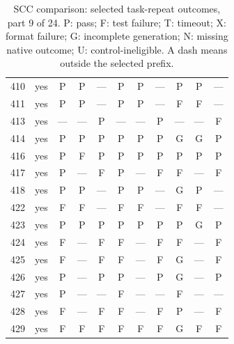 \begin{table}[p]
\begin{tabular*}{\textwidth}{@{\extracolsep{\fill}}rc*{9}{c}@{}}
410 & yes & P & P & — & P & P & — & P & P & —\\
411 & yes & P & P & — & P & P & — & F & F & —\\
413 & yes & — & — & P & — & — & P & — & — & F\\
414 & yes & P & P & P & P & P & P & G & G & P\\
416 & yes & P & F & P & P & P & P & P & P & P\\
417 & yes & P & — & F & P & — & F & F & — & F\\
418 & yes & P & P & — & P & P & — & G & P & —\\
422 & yes & F & F & — & F & F & — & F & F & —\\
423 & yes & P & P & P & P & P & P & P & G & P\\
424 & yes & F & — & F & F & — & F & F & — & F\\
425 & yes & F & — & F & F & — & F & G & — & F\\
426 & yes & P & — & P & P & — & P & G & — & P\\
427 & yes & P & — & — & F & — & — & F & — & —\\
428 & yes & F & — & F & F & — & F & P & — & F\\
429 & yes & F & F & F & F & F & F & G & F & F\\
\bottomrule\end{tabular*}
\caption{SCC comparison: selected task-repeat outcomes, part 9 of 24. P: pass; F: test failure; T: timeout; X: format failure; G: incomplete generation; N: missing native outcome; U: control-ineligible. A dash means outside the selected prefix.}
\end{table}
\clearpage
